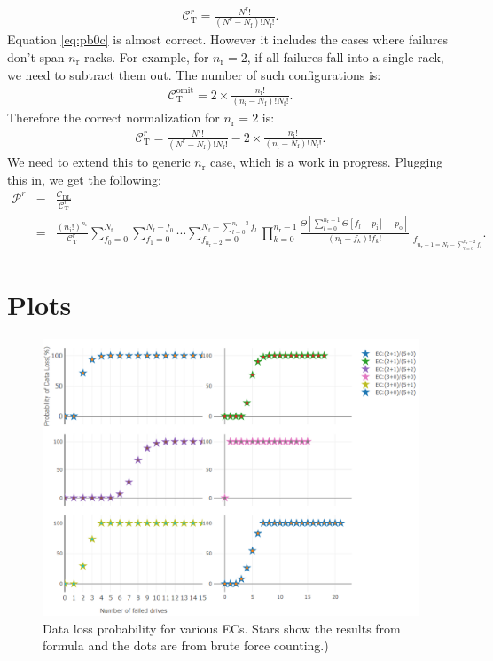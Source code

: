 \documentclass[journal]{IEEEtran}
\begin{document}
\begin{eqnarray}
\mathcal{C}^r_\text{T}=\frac{N^r!}{(N^r-N_\text{f})!N_\text{f}!}.
\label{eq:pb0c}
\end{eqnarray}
Equation \eqref{eq:pb0c} is almost correct. However it includes the cases where failures don't span \(n_\text{r}\) racks.
For example, for \(n_\text{r}=2\), if all failures fall into a single rack, we need to subtract them out. The number of such configurations is:
\begin{eqnarray}
\mathcal{C}^\text{omit}_\text{T}=2\times \frac{n_\text{i}!}{(n_\text{i}-N_\text{f})!N_\text{f}!}.
\label{eq:pb0co}
\end{eqnarray}
Therefore the correct normalization for \(n_\text{r}=2\) is:
\begin{eqnarray}
\mathcal{C}^r_\text{T}=\frac{N^r!}{(N^r-N_\text{f})!N_\text{f}!}-2\times \frac{n_\text{i}!}{(n_\text{i}-N_\text{f})!N_\text{f}!}.
\label{eq:pb0cw}
\end{eqnarray}
We need to extend this to generic \(n_\text{r}\) case, which is a work in progress.
Plugging this in, we get the following:
\begin{eqnarray}
\mathcal{P}^r&=&\frac{\mathcal{C}_\text{DL}}{\mathcal{C}^r_\text{T}}\nonumber\\
&=& \frac{\left(n_\text{i}!\right)^{n_\text{r}}}{ \mathcal{C}^r_\text{T}}  \sum_{f_0=0}^{N_\text{f}}\sum_{f_1=0}^{N_\text{f}-f_0}\cdots \sum_{f_{n_\text{r}-2}=0}^{N_\text{f}-\sum_{l=0}^{n_\text{r}-3}f_l} {\displaystyle \prod_{k=0}^{n_\text{r}-1}} \frac{\Theta\left[  \sum_{l=0}^{n_\text{r}-1}  \Theta \left[f_l-p_\text{i} \right]-p_\text{o}     \right]}{(n_\text{i}-f_k)!f_k!}\bigg\rvert_{f_{ n_\text{r}-1=N_\text{f}-\sum_{l=0}^{n_\text{r}-2}f_l}}.
\label{eq:plossR}
\end{eqnarray}

\hypertarget{plots}{%
\section{Plots}\label{plots}}

\begin{figure}[H]

{\centering \includegraphics[width=0.65\linewidth]{combined} 

}

\caption{Data loss probability for various ECs. Stars show the results from formula and the dots are from brute force counting.)}\label{fig:combined}
\end{figure}
\end{document}
